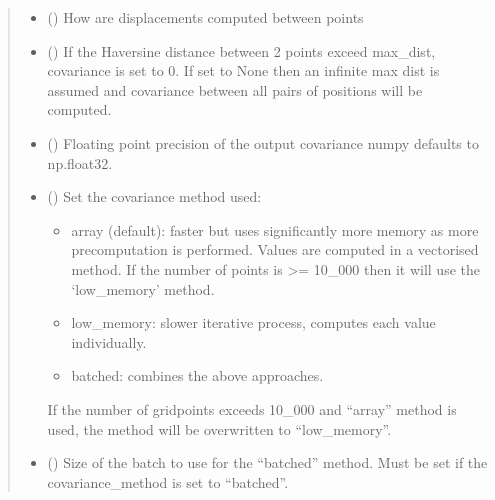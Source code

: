 \documentclass[letterpaper,10pt,english]{sphinxmanual}
\begin{document}
\begin{fulllineitems}
\begin{quote}
\begin{description}
\begin{itemize}
\item {}
\sphinxAtStartPar
{} () \textendash{} How are displacements computed between points

\item {}
\sphinxAtStartPar
{} (\sphinxstyleliteralemphasis{\sphinxupquote{ | }}) \textendash{} If the Haversine distance between 2 points exceed max\_dist,
covariance is set to 0. If set to None then an infinite max dist is
assumed and covariance between all pairs of positions will be computed.

\item {}
\sphinxAtStartPar
{} () \textendash{} Floating point precision of the output covariance numpy defaults to
np.float32.

\item {}
\sphinxAtStartPar
{} () \textendash{}
\sphinxAtStartPar
Set the covariance method used:
\begin{itemize}
\item {}
\sphinxAtStartPar
array (default): faster but uses significantly more memory as
more pre\sphinxhyphen{}computation is performed. Values are computed in a
vectorised method. If the number of points is \textgreater{}= 10\_000 then it will
use the ‘low\_memory’ method.

\item {}
\sphinxAtStartPar
low\_memory: slower iterative process, computes each value
individually.

\item {}
\sphinxAtStartPar
batched: combines the above approaches.

\end{itemize}

\sphinxAtStartPar
If the number of grid\sphinxhyphen{}points exceeds 10\_000 and “array” method is used,
the method will be overwritten to “low\_memory”.


\item {}
\sphinxAtStartPar
{} (\sphinxstyleliteralemphasis{\sphinxupquote{ | }}) \textendash{} Size of the batch to use for the “batched” method. Must be set if the
covariance\_method is set to “batched”.


\end{itemize}
\end{description}
\end{quote}
\end{fulllineitems}
\end{document}
